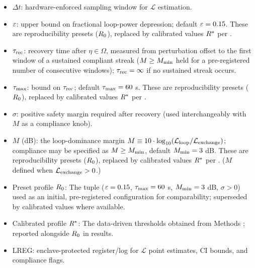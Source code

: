 \documentclass[11pt]{article}
\begin{document}
\begin{itemize}
\item $\Delta t$: hardware-enforced sampling window for $\mathcal{L}$ estimation.
\item $\varepsilon$: upper bound on fractional loop-power depression; default $\varepsilon = 0.15$. These are reproducibility presets ($R_0$), replaced by calibrated values $R^*$ per .
\item $\tau_{\text{rec}}$: recovery time after $\eta\in\Omega$, measured from perturbation offset to the first window of a sustained compliant streak ($M \geq M_{\min}$ held for a pre-registered number of consecutive windows); $\tau_{\text{rec}} = \infty$ if no sustained streak occurs.
\item $\tau_{\max}$: bound on $\tau_{\text{rec}}$; default $\tau_{\max} = 60$ s. These are reproducibility presets ($R_0$), replaced by calibrated values $R^*$ per .
\item $\sigma$: positive safety margin required after recovery (used interchangeably with $M$ as a compliance knob).
\item $M$ (dB): the loop-dominance margin $M \equiv 10\cdot\log_{10}(\mathcal{L}_{\text{loop}}/\mathcal{L}_{\text{exchange}})$; compliance may be specified as $M \geq M_{\min}$, default $M_{\min} = 3$ dB. These are reproducibility presets ($R_0$), replaced by calibrated values $R^*$ per . ($M$ defined when $\mathcal{L}_{\text{exchange}}>0$.)
\item Preset profile $R_0$: The tuple ($\varepsilon=0.15$, $\tau_{\max}=60$ s, $M_{\min}=3$ dB, $\sigma>0$) used as an initial, pre-registered configuration for comparability; superseded by calibrated values where available.
\item Calibrated profile $R^*$: The data-driven thresholds obtained from Methods ; reported alongside $R_0$ in results.
\item LREG: enclave-protected register/log for $\mathcal{L}$ point estimates, CI bounds, and compliance flags.
\end{itemize}
\end{document}

